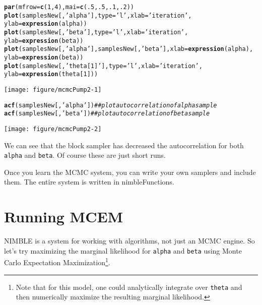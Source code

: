 \documentclass[12pt,oneside]{book}\usepackage[]{graphicx}\usepackage[]{color}
\makeatletter
\def\maxwidth{ %
  \ifdim\Gin@nat@width>\linewidth
    \linewidth
  \else
    \Gin@nat@width
  \fi
}
\newcommand{\hlnum}[1]{\textcolor[rgb]{0.686,0.059,0.569}{#1}}%
\newcommand{\hlstr}[1]{\textcolor[rgb]{0.192,0.494,0.8}{#1}}%
\newcommand{\hlcom}[1]{\textcolor[rgb]{0.678,0.584,0.686}{\textit{#1}}}%
\newcommand{\hlstd}[1]{\textcolor[rgb]{0.345,0.345,0.345}{#1}}%
\newcommand{\hlkwc}[1]{\textcolor[rgb]{0.333,0.667,0.333}{#1}}%
\newcommand{\hlkwd}[1]{\textcolor[rgb]{0.737,0.353,0.396}{\textbf{#1}}}%
\newenvironment{kframe}{%
 \def\at@end@of@kframe{}%
 \ifinner\ifhmode%
  \def\at@end@of@kframe{\end{minipage}}%
  \begin{minipage}{\columnwidth}%
 \fi\fi%
 \def\FrameCommand##1{\hskip\@totalleftmargin \hskip-\fboxsep
 \colorbox{shadecolor}{##1}\hskip-\fboxsep
     \hskip-\linewidth \hskip-\@totalleftmargin \hskip\columnwidth}%
 \MakeFramed {\advance\hsize-\width
   \@totalleftmargin\z@ \linewidth\hsize
   \@setminipage}}%
 {\par\unskip\endMakeFramed%
 \at@end@of@kframe}
\newenvironment{knitrout}{}{} %
\def\cd#1{\texttt{#1}}
\makeatother
\begin{document}
\begin{knitrout}
\begin{kframe}
\begin{alltt}
\hlkwd{par}\hlstd{(}\hlkwc{mfrow} \hlstd{=} \hlkwd{c}\hlstd{(}\hlnum{1}\hlstd{,} \hlnum{4}\hlstd{),} \hlkwc{mai} \hlstd{=} \hlkwd{c}\hlstd{(}\hlnum{.5}\hlstd{,} \hlnum{.5}\hlstd{,} \hlnum{.1}\hlstd{,} \hlnum{.2}\hlstd{))}
\hlkwd{plot}\hlstd{(samplesNew[ ,} \hlstr{'alpha'}\hlstd{],} \hlkwc{type} \hlstd{=} \hlstr{'l'}\hlstd{,} \hlkwc{xlab} \hlstd{=} \hlstr{'iteration'}\hlstd{,}
     \hlkwc{ylab} \hlstd{=} \hlkwd{expression}\hlstd{(alpha))}
\hlkwd{plot}\hlstd{(samplesNew[ ,} \hlstr{'beta'}\hlstd{],} \hlkwc{type} \hlstd{=} \hlstr{'l'}\hlstd{,} \hlkwc{xlab} \hlstd{=} \hlstr{'iteration'}\hlstd{,}
     \hlkwc{ylab} \hlstd{=} \hlkwd{expression}\hlstd{(beta))}
\hlkwd{plot}\hlstd{(samplesNew[ ,} \hlstr{'alpha'}\hlstd{], samplesNew[ ,} \hlstr{'beta'}\hlstd{],} \hlkwc{xlab} \hlstd{=} \hlkwd{expression}\hlstd{(alpha),}
     \hlkwc{ylab} \hlstd{=} \hlkwd{expression}\hlstd{(beta))}
\hlkwd{plot}\hlstd{(samplesNew[ ,} \hlstr{'theta[1]'}\hlstd{],} \hlkwc{type} \hlstd{=} \hlstr{'l'}\hlstd{,} \hlkwc{xlab} \hlstd{=} \hlstr{'iteration'}\hlstd{,}
     \hlkwc{ylab} \hlstd{=} \hlkwd{expression}\hlstd{(theta[}\hlnum{1}\hlstd{]))}
\end{alltt}
\end{kframe}
\texttt{[image: figure/mcmcPump2-1]} 
\begin{kframe}\begin{alltt}
\hlkwd{acf}\hlstd{(samplesNew[,} \hlstr{'alpha'}\hlstd{])} \hlcom{## plot autocorrelation of alpha sample}
\hlkwd{acf}\hlstd{(samplesNew[,} \hlstr{'beta'}\hlstd{])}  \hlcom{## plot autocorrelation of beta  sample}
\end{alltt}
\end{kframe}
\texttt{[image: figure/mcmcPump2-2]} 

\end{knitrout}

We can see that the block sampler has decreased the 
autocorrelation for both \cd{alpha} and \cd{beta}.  Of course these
are just short runs.

Once you learn the MCMC system, you can write your own samplers and
include them.  The entire system is written in nimbleFunctions.

\section{Running MCEM}
\label{sec:running-mcem}

NIMBLE is a system for working with algorithms, not just an MCMC engine. So let's try maximizing the marginal likelihood for \cd{alpha} and \cd{beta} using Monte Carlo Expectation Maximization\footnote{Note that for this model, one could analytically integrate over \cd{theta} and then numerically maximize the resulting marginal likelihood.}. 
\end{document}
